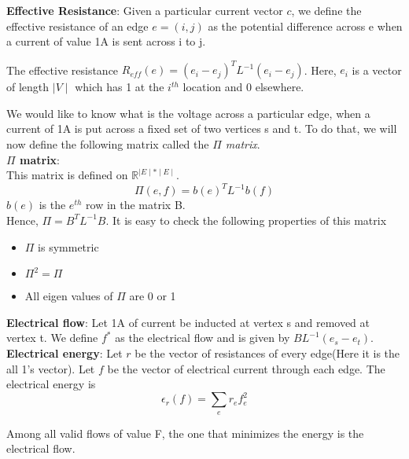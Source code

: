 \documentclass[BTech]{iitmdiss}
\begin{document}
 		     \textbf{Effective Resistance}: Given a particular current vector $c$, we define the effective resistance of an edge $e=(i,j)$ as the 
 		     potential difference across e when a current of value 1A is sent across i to j. \\
 		     
 		     \begin{prop}
		      The effective resistance $R_{eff}(e) = (e_i - e_j)^T L^{-1} (e_i - e_j)$. Here, $e_i$ is a vector of length
 		     $\mid V \mid$ which has 1 at the $i^{th}$ location and 0 elsewhere. 
 		      
 		     \end{prop}

 		     
 		     We would like to know what is the voltage across a particular edge, when a current of 1A is put across a fixed set of two vertices
 		     s and t. To do that, we will now define the following matrix called the \textit{$\Pi$ matrix}. \\
 		     
 		     \textbf{$\Pi$ matrix}: \\
 		     This matrix is defined on $\mathbb{R}^{\mid E \mid \ast \mid E \mid}$. 
 		     $$\Pi(e,f) = b(e)^T L^{-1} b(f)$$
 		     $b(e)$ is the $e^{th}$ row in the matrix B. \\
 		     
 		     Hence, $\Pi = B^{T} L^{-1} B$. It is easy to check the following properties of this matrix
 		     
 		     \begin{itemize}
 		      \item 
			$\Pi$ is symmetric
		      \item
			$\Pi^2 = \Pi$
		      \item
			All eigen values of $\Pi$ are 0 or 1
 		     \end{itemize}

 		    \textbf{Electrical flow}: Let 1A of current be inducted at vertex s and removed at vertex t. We define $f^{\ast}$ as the electrical 
 		    flow and is given by $BL^{-1}(e_s-e_t)$. \\
 		    
 		    \textbf{Electrical energy}: Let $r$ be the vector of resistances of every edge(Here it is the all 1's vector). Let $f$ be the 
 		    vector of electrical current through each edge. The electrical energy is
 		    $$\epsilon_r(f) = \displaystyle\sum_{e}r_e f_{e}^{2}$$
 		    
 		    \begin{lemma}
		    Among all valid flows of value F, the one that minimizes the energy is the electrical flow.
		    \end{lemma}
		    
\end{document}
